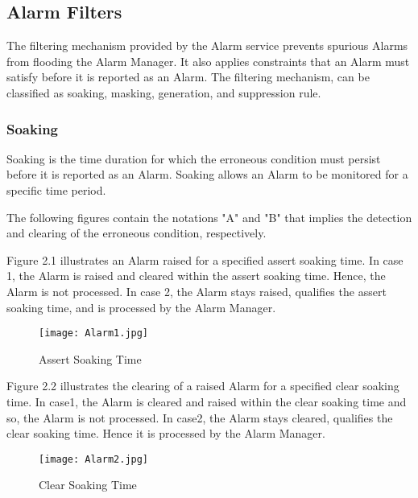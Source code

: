 \begin{flushleft}
\subsection{Alarm Filters}
The filtering mechanism provided by the Alarm service prevents spurious Alarms from flooding the Alarm Manager. It also applies constraints that an 
Alarm must satisfy before it is reported as an Alarm. The filtering mechanism, can be classified as soaking, masking, generation, and suppression rule. 

\subsubsection{Soaking}
Soaking is the time duration for which the erroneous condition must persist before it is reported as an Alarm. Soaking allows an Alarm to be monitored 
for a specific time period. 
\par
The following figures contain the notations "A" and "B" that implies the detection and clearing of the 
erroneous condition, respectively.
\par
Figure 2.1 illustrates an Alarm raised for a specified assert soaking time. In case 1, the Alarm is raised and cleared within the assert soaking time. 
Hence, the Alarm is not processed. In case 2, the Alarm stays raised, qualifies the assert soaking time, and is processed by the Alarm Manager. 
\newpage
\end{flushleft}
\begin{figure}
\begin{center}
\texttt{[image: Alarm1.jpg]}
\end{center}
\caption{Assert Soaking Time}
\end{figure}

\begin{flushleft}
\newpage
Figure 2.2 illustrates the clearing of a raised Alarm for a specified clear soaking time. In case1, the Alarm is cleared and raised within the 
clear soaking time and so, the Alarm is not processed. In case2, the Alarm stays cleared, qualifies the clear soaking time. Hence it is processed by 
the Alarm Manager.

\end{flushleft}
\begin{figure}
\begin{center}
\texttt{[image: Alarm2.jpg]}
\end{center}
\caption{Clear Soaking Time}
\end{figure}

